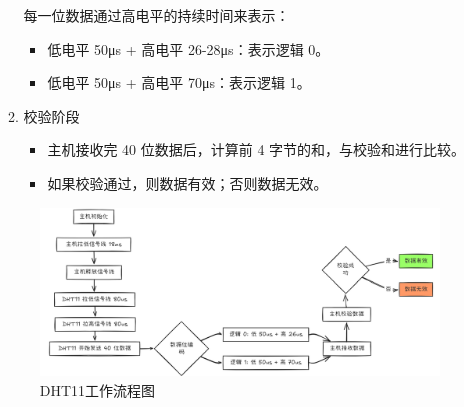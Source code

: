 \documentclass[UTF8]{ctexart}
\begin{document}
\begin{itemize}
\begin{enumerate}
			 每一位数据通过高电平的持续时间来表示：
			\begin{itemize}
				\item 低电平 50μs + 高电平 26-28μs：表示逻辑 0。
				\item 低电平 50μs + 高电平 70μs：表示逻辑 1。
			\end{itemize}

		\item 校验阶段
		\begin{itemize}
			\item 主机接收完 40 位数据后，计算前 4 字节的和，与校验和进行比较。
			\item 如果校验通过，则数据有效；否则数据无效。
		\end{itemize}
	\end{enumerate}
	\begin{figure}[htbp]
		\centering
		\includegraphics[width=0.98\linewidth]{figure/4}
		\caption{DHT11工作流程图} %
		\label{fig:image2} %
	\end{figure}
	
\end{itemize}
\end{document}
